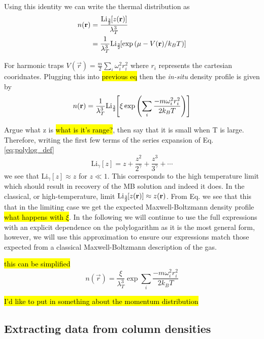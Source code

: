 Using this identity we can write the thermal distribution as
	\begin{equation}
	\begin{split}
	n(\mathbf{r}) &= \frac{\text{Li}_{\scriptscriptstyle\frac{3}{2}\!}\!\left[ z(\mathbf{r}) \right]}{\lambda_T^3} \\
				 &= \frac{1}{\lambda_T^3}\text{Li}_{\scriptscriptstyle\frac{3}{2}\!}\!\left[ \text{exp}\left( {\mu-V(\mathbf{r})/k_BT} \right) \right]
	\end{split}
	\end{equation}

For harmonic traps $V(\vec{r}) = \frac{m}{2}\displaystyle\sum_i\omega_i^2r_i^2$ where $r_i$ represents the cartesian cooridnates. Plugging this into \hl{previous eq} then the \textit{in-situ} density profile is given by
\begin{equation}
n(\mathbf{r}) = \frac{1}{\lambda_T^3}\text{Li}_{\scriptscriptstyle\frac{3}{2}\!}\!\left[ \xi \,\text{exp}\left( {\sum_i\frac{-m\omega_i^2r_i^2}{2 k_B T}} \right) \right]
\end{equation}

Argue what z is \hl{what is it's range?}, then say that it is small when T is large. Therefore, writing the first few terms of the series expansion of Eq.\ref{eq:polylog_def}
	\begin{equation}
	\text{Li}_{\gamma}[z] = z + \frac{z^2}{2^{\gamma}} + \frac{z^3}{3^{\gamma}} + \cdots
	\end{equation}
we see that Li$_{\gamma}[z] \approx z$ for $z \ll 1$. This corresponds to the high temperature limit which should result in recovery of the MB solution and indeed it does.
In the classical, or high-temperature, limit $\text{Li}_{\scriptscriptstyle\frac{3}{2}\!}\!\left[ z(\mathbf{r}) \right] \approx z(\mathbf{r})$. From Eq. we see that this that in the limiting case we get the expected Maxwell-Boltzmann density profile \hl{what happens with $\xi$}. In the following we will continue to use the full expressions with an explicit dependence on the polylogarithm as it is the most general form, however, we will use this approximation to ensure our expressions match those expected from a classical Maxwell-Boltzmann description of the gas.

\hl{this can be simplified}
\begin{equation}
n(\vec{r}) = \frac{\xi}{\lambda_T^3}\exp{\sum_i\frac{-m\omega_i^2r_i^2}{2 k_B T}}
\end{equation}

\hl{I'd like to put in something about the momentum distribution}

\subsection{Extracting data from column densities} \label{ssec:tof}

